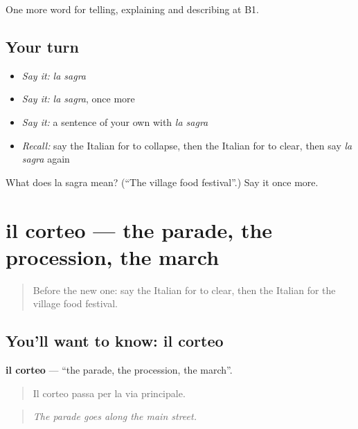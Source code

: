 \begin{grammarlens}[title={What you've built}]
One more word for telling, explaining and describing at B1.
\end{grammarlens}

\subsection*{Your turn}
\begin{itemize}
\raggedright
  \item \emph{Say it:} \emph{la sagra}
  \item \emph{Say it:} \emph{la sagra}, once more
  \item \emph{Say it:} a sentence of your own with \emph{la sagra}
  \item \emph{Recall:} say the Italian for to collapse, then the Italian for to clear, then say \emph{la sagra} again
\end{itemize}

\begin{tcolorbox}[breakable,colback=teal!4,colframe=teal!35!black,title={Before you move on}]
What does la sagra mean? (\textquotedblleft{}The village food festival\textquotedblright{}.) Say it once more.
\end{tcolorbox}
\section[il corteo]{il corteo — the parade, the procession, the march}

\label{lesson:IT-C450-corteo}



\begin{quote}
Before the new one: say the Italian for to clear, then the Italian for the village food festival.
\end{quote}

\subsection*{You'll want to know: il corteo}
\textbf{il corteo} — \textquotedblleft{}the parade, the procession, the march\textquotedblright{}.

\begin{quote}
Il corteo passa per la via principale.
\end{quote}

\begin{quote}
\emph{The parade goes along the main street.}
\end{quote}

